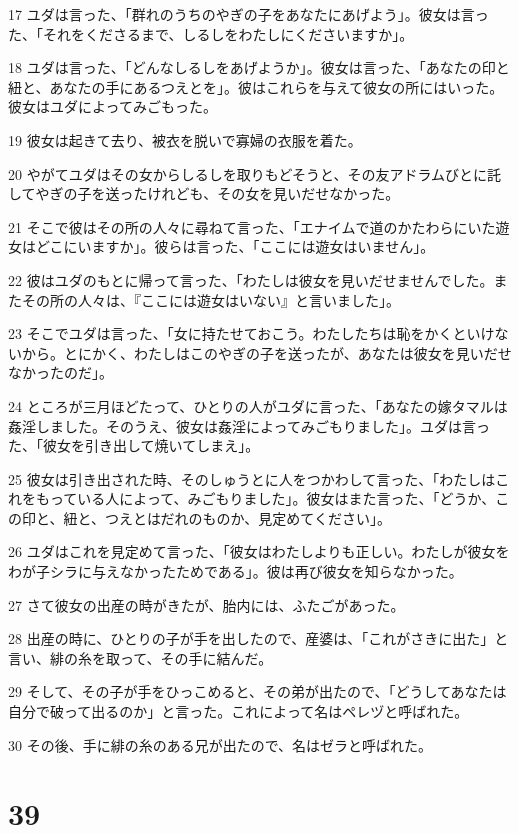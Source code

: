 \par 17 ユダは言った、「群れのうちのやぎの子をあなたにあげよう」。彼女は言った、「それをくださるまで、しるしをわたしにくださいますか」。
\par 18 ユダは言った、「どんなしるしをあげようか」。彼女は言った、「あなたの印と紐と、あなたの手にあるつえとを」。彼はこれらを与えて彼女の所にはいった。彼女はユダによってみごもった。
\par 19 彼女は起きて去り、被衣を脱いで寡婦の衣服を着た。
\par 20 やがてユダはその女からしるしを取りもどそうと、その友アドラムびとに託してやぎの子を送ったけれども、その女を見いだせなかった。
\par 21 そこで彼はその所の人々に尋ねて言った、「エナイムで道のかたわらにいた遊女はどこにいますか」。彼らは言った、「ここには遊女はいません」。
\par 22 彼はユダのもとに帰って言った、「わたしは彼女を見いだせませんでした。またその所の人々は、『ここには遊女はいない』と言いました」。
\par 23 そこでユダは言った、「女に持たせておこう。わたしたちは恥をかくといけないから。とにかく、わたしはこのやぎの子を送ったが、あなたは彼女を見いだせなかったのだ」。
\par 24 ところが三月ほどたって、ひとりの人がユダに言った、「あなたの嫁タマルは姦淫しました。そのうえ、彼女は姦淫によってみごもりました」。ユダは言った、「彼女を引き出して焼いてしまえ」。
\par 25 彼女は引き出された時、そのしゅうとに人をつかわして言った、「わたしはこれをもっている人によって、みごもりました」。彼女はまた言った、「どうか、この印と、紐と、つえとはだれのものか、見定めてください」。
\par 26 ユダはこれを見定めて言った、「彼女はわたしよりも正しい。わたしが彼女をわが子シラに与えなかったためである」。彼は再び彼女を知らなかった。
\par 27 さて彼女の出産の時がきたが、胎内には、ふたごがあった。
\par 28 出産の時に、ひとりの子が手を出したので、産婆は、「これがさきに出た」と言い、緋の糸を取って、その手に結んだ。
\par 29 そして、その子が手をひっこめると、その弟が出たので、「どうしてあなたは自分で破って出るのか」と言った。これによって名はペレヅと呼ばれた。
\par 30 その後、手に緋の糸のある兄が出たので、名はゼラと呼ばれた。

\chapter{39}

